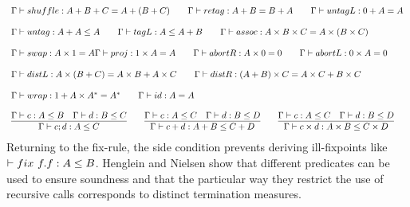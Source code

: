 \documentclass[a4paper,UKenglish,cleveref, autoref, thm-restate]{lipics-v2021}
\begin{document}
\begin{displaymath}
\begin{array}{lll}
\myaxiomC{shuffle}{A + B + C}{A + (B + C)} \qquad  
\myaxiomC{retag}{A + B}{B + A} \qquad 
\myaxiomC{untagL}{0 + A}{A} 
\\\\
\containsG{untag}{A + A}{A}   \qquad \containsG{tagL}{A}{A + B} \qquad

\myaxiomC{assoc}{A \times B \times C}{A \times (B \times C)}
\\\\
\myaxiomC{swap}{A \times 1}{A} 
\myaxiomC{proj}{1 \times A}{A} \qquad
\myaxiomC{abortR}{A \times 0}{0} \qquad
\myaxiomC{abortL}{0 \times A}{0} 
\\\\
\myaxiomC{distL}{A \times (B + C)} {A \times B + A \times C} \qquad
\myaxiomC{distR}{(A + B)\times C}{A \times C + B \times C} 
\\\\
\myaxiomC{wrap}{1 + A \times A^*}{A^* } \qquad \myaxiomC{id}{A}{A}
\\\\
\infer{\containsG{c;d}{A}{C}}{\containsG{c}{A}{B} & \containsG{d}{B}{C}} \qquad

\infer{\containsG{c + d}{A + B}{ C + D}}{\containsG{c}{A}{C} & \containsG{d}{B}{D}}  \qquad

\infer{\containsG{c \times d}{A \times B}{ C \times D}}{\containsG{c}{A}{C} & \containsG{d}{B}{D}} 
\end{array}
\end{displaymath}
Returning to the fix-rule, the side condition prevents deriving ill-fixpoints like $\contains{}{\fix ~ f.f}{A}{B}$. Henglein and Nielsen show that different predicates can be used to ensure soundness and that the particular way they restrict the use of recursive calls corresponds to distinct termination measures.\\\\
\end{document}
